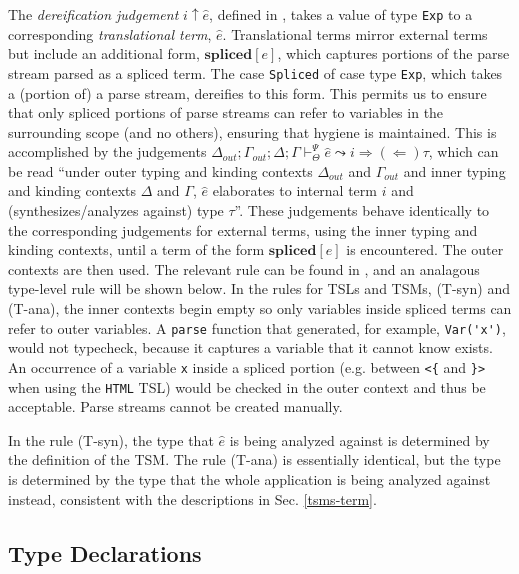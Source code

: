 \documentclass{sig-alternate}
\begin{document}
The \emph{dereification judgement} $i \uparrow \hat{e}$, defined in \cite{TSLs}, takes a value of type \verb|Exp| to a corresponding \emph{translational term}, $\hat{e}$. 
Translational terms mirror external terms but include an additional form, $\textbf{spliced}[e]$, which captures portions of the parse stream parsed as a spliced term. The case \verb|Spliced| of case type \verb|Exp|, which takes a (portion of) a parse stream, dereifies to this form. This permits us to ensure that only spliced portions of parse streams can refer to variables in the surrounding scope (and no others), ensuring that hygiene is maintained. This is accomplished by the judgements $\Delta_{out}; \Gamma_{out}; \Delta; \Gamma \vdash_{\Theta}^{\Psi} \hat{e} \leadsto i {\Rightarrow}{(\Leftarrow)} \tau$, which can be read ``under outer typing and kinding contexts $\Delta_{out}$ and $\Gamma_{out}$ and inner typing and kinding contexts $\Delta$ and $\Gamma$,  $\hat{e}$ elaborates to internal term $i$ and (synthesizes/analyzes against) type $\tau$''. These judgements behave identically to the corresponding judgements for external terms, using the inner typing and kinding contexts, until a term of the form $\textbf{spliced}[e]$ is encountered. The outer contexts are then used. The relevant rule can be found in \cite{TSLs}, and an analagous type-level rule will be shown below. 
In the rules for TSLs and TSMs, (T-syn) and (T-ana), the inner contexts begin empty so only variables inside spliced terms can refer to outer variables. A \verb|parse| function that generated, for example, \verb|Var('x')|, would not typecheck, because it captures a variable that it cannot know exists. An occurrence of a variable \verb|x| inside a spliced portion (e.g. between \verb|<{| and \verb|}>| when using the \verb|HTML| TSL) would be checked in the outer context and thus be acceptable. Parse streams cannot be created manually. %

In the rule (T-syn), the type that $\hat{e}$ is being analyzed against is determined by the definition of the TSM. The rule (T-ana) is essentially identical, but the type is determined by the type that the whole application is being analyzed against instead, consistent with the descriptions in Sec. \ref{tsms-term}. 


\subsection{Type Declarations}\label{declarations}

\end{document}
